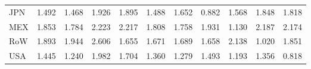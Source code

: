 \begin{table}[htbp]
\begin{tabular}{lcccccccccc}
  JPN & \textcolor[RGB]{189,122,66}{1.492} & \textcolor[RGB]{194,125,61}{1.468} & \textcolor[RGB]{79,51,176}{1.926} & \textcolor[RGB]{82,53,173}{1.895} & \textcolor[RGB]{191,124,64}{1.488} & \textcolor[RGB]{158,102,97}{1.652} & \textcolor[RGB]{247,160,8}{0.882} & \textcolor[RGB]{171,111,84}{1.568} & \textcolor[RGB]{92,59,163}{1.848} & \textcolor[RGB]{107,69,148}{1.818} \\ 
  MEX & \textcolor[RGB]{87,56,168}{1.853} & \textcolor[RGB]{120,78,135}{1.784} & \textcolor[RGB]{28,18,227}{2.223} & \textcolor[RGB]{31,20,224}{2.217} & \textcolor[RGB]{112,73,143}{1.808} & \textcolor[RGB]{125,81,130}{1.758} & \textcolor[RGB]{74,48,181}{1.931} & \textcolor[RGB]{232,150,23}{1.130} & \textcolor[RGB]{33,21,222}{2.187} & \textcolor[RGB]{36,23,219}{2.174} \\ 
  RoW & \textcolor[RGB]{84,54,171}{1.893} & \textcolor[RGB]{69,45,186}{1.944} & \textcolor[RGB]{8,5,247}{2.606} & \textcolor[RGB]{156,101,99}{1.655} & \textcolor[RGB]{148,96,107}{1.671} & \textcolor[RGB]{145,94,110}{1.689} & \textcolor[RGB]{153,99,102}{1.658} & \textcolor[RGB]{38,25,217}{2.138} & \textcolor[RGB]{240,155,15}{1.020} & \textcolor[RGB]{89,58,166}{1.851} \\ 
  USA & \textcolor[RGB]{196,127,59}{1.445} & \textcolor[RGB]{222,144,33}{1.240} & \textcolor[RGB]{64,41,191}{1.982} & \textcolor[RGB]{140,91,115}{1.704} & \textcolor[RGB]{207,134,48}{1.360} & \textcolor[RGB]{217,140,38}{1.279} & \textcolor[RGB]{186,120,69}{1.493} & \textcolor[RGB]{224,145,31}{1.193} & \textcolor[RGB]{209,135,46}{1.356} & \textcolor[RGB]{250,162,5}{0.818} \\ 
   \hline
\end{tabular}
\end{table}
